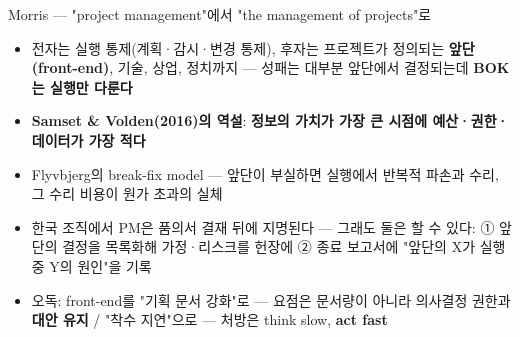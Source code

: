 \begin{frame}{Morris — "project management"에서 "the management of projects"로}
\begin{itemize}
\item 전자는 실행 통제(계획·감시·변경 통제), 후자는 프로젝트가 정의되는 \textbf{앞단(front-end)}, 기술, 상업, 정치까지 — 성패는 대부분 앞단에서 결정되는데 \textbf{BOK는 실행만 다룬다}
\item \textbf{Samset \& Volden(2016)의 역설}: \textbf{정보의 가치가 가장 큰 시점에 예산·권한·데이터가 가장 적다}
\item Flyvbjerg의 break-fix model — 앞단이 부실하면 실행에서 반복적 파손과 수리, 그 수리 비용이 원가 초과의 실체
\item 한국 조직에서 PM은 품의서 결재 뒤에 지명된다 — 그래도 둘은 할 수 있다: ① 앞단의 결정을 목록화해 가정·리스크를 헌장에 ② 종료 보고서에 "앞단의 X가 실행 중 Y의 원인"을 기록
\item 오독: front-end를 "기획 문서 강화"로 — 요점은 문서량이 아니라 의사결정 권한과 \textbf{대안 유지} / "착수 지연"으로 — 처방은 think slow, \textbf{act fast}
\end{itemize}
\end{frame}

